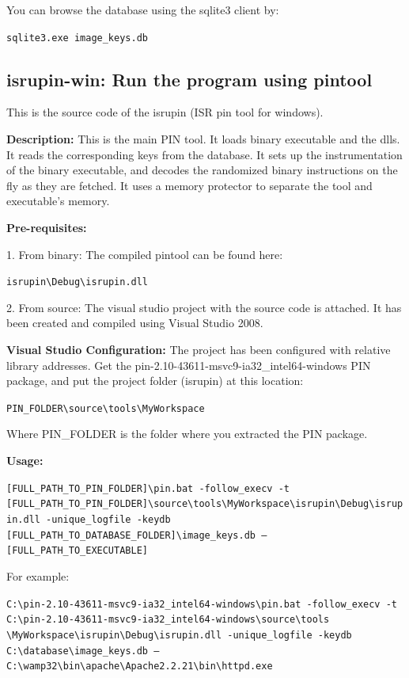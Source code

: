 \documentclass[a4paper,12pt]{llncs}
\begin{document}
You can browse the database using the sqlite3 client by:

{\small \texttt{sqlite3.exe image\_keys.db}}

\subsection{isrupin-win: Run the program using pintool}
This is the source code of the isrupin (ISR pin tool for windows).

\textbf{Description:}
This is the main PIN tool. It loads binary executable and the dlls. It reads the corresponding keys from the
database. It sets up the instrumentation of the binary executable, and decodes the randomized binary instructions
on the fly as they are fetched. It uses a memory protector to separate the tool and executable's memory.

\textbf{Pre-requisites:}

1. From binary: The compiled pintool can be found here:

{\small \texttt{isrupin{\textbackslash}Debug{\textbackslash}isrupin.dll}}

2. From source: The visual studio project with the source code is attached. It has been created
and compiled using Visual Studio 2008.

\textbf{Visual Studio Configuration:}
The project has been configured with relative library addresses.
Get the pin-2.10-43611-msvc9-ia32\_intel64-windows PIN package,
and put the project folder (isrupin) at this location:

{\small \texttt{PIN\_FOLDER{\textbackslash}source{\textbackslash}tools{\textbackslash}MyWorkspace}}

Where PIN\_FOLDER is the folder where you extracted the PIN package.


\textbf{Usage:}

{\tiny \texttt{[FULL\_PATH\_TO\_PIN\_FOLDER]{\textbackslash}pin.bat -follow\_execv -t [FULL\_PATH\_TO\_PIN\_FOLDER]{\textbackslash}source{\textbackslash}tools{\textbackslash}MyWorkspace{\textbackslash}isrupin{\textbackslash}Debug{\textbackslash}isrupin.dll -unique\_logfile -keydb [FULL\_PATH\_TO\_DATABASE\_FOLDER]{\textbackslash}image\_keys.db -- [FULL\_PATH\_TO\_EXECUTABLE]}}

For example:

{\tiny \texttt{C:{\textbackslash}pin-2.10-43611-msvc9-ia32\_intel64-windows{\textbackslash}pin.bat -follow\_execv -t C:{\textbackslash}pin-2.10-43611-msvc9-ia32\_intel64-windows{\textbackslash}source{\textbackslash}tools {\textbackslash}MyWorkspace{\textbackslash}isrupin{\textbackslash}Debug{\textbackslash}isrupin.dll -unique\_logfile -keydb C:{\textbackslash}database{\textbackslash}image\_keys.db -- C:{\textbackslash}wamp32{\textbackslash}bin{\textbackslash}apache{\textbackslash}Apache2.2.21{\textbackslash}bin{\textbackslash}httpd.exe}}
\end{document}
